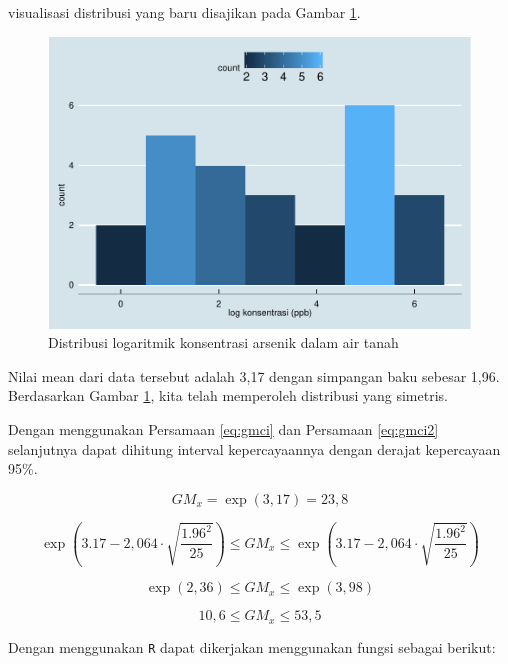\documentclass[]{book}
\begin{document}
visualisasi distribusi yang baru disajikan pada Gambar
\ref{fig:gwardatvis2}.

\begin{figure}

{\centering \includegraphics[width=0.7\linewidth]{EnvStat_files/figure-latex/gwardatvis2-1} 

}

\caption{Distribusi logaritmik konsentrasi arsenik dalam air tanah}\label{fig:gwardatvis2}
\end{figure}

Nilai mean dari data tersebut adalah 3,17 dengan simpangan baku sebesar
1,96. Berdasarkan Gambar \ref{fig:gwardatvis2}, kita telah memperoleh
distribusi yang simetris.

Dengan menggunakan Persamaan \eqref{eq:gmci} dan Persamaan \eqref{eq:gmci2}
selanjutnya dapat dihitung interval kepercayaannya dengan derajat
kepercayaan 95\%.

\[
  GM_x=\exp\left(3,17\right)=23,8
\]

\[
  \exp\left(3.17-2,064\cdot\sqrt{\frac{1.96^2}{25}}\right)\le GM_x\le\exp\left(3.17-2,064\cdot\sqrt{\frac{1.96^2}{25}}\right)
\]

\[
  \exp\left(2,36\right)\le GM_x\le\exp\left(3,98\right)
\]

\[
  10,6\le GM_x\le53,5
\]

Dengan menggunakan \texttt{R} dapat dikerjakan menggunakan fungsi
sebagai berikut:
\end{document}
